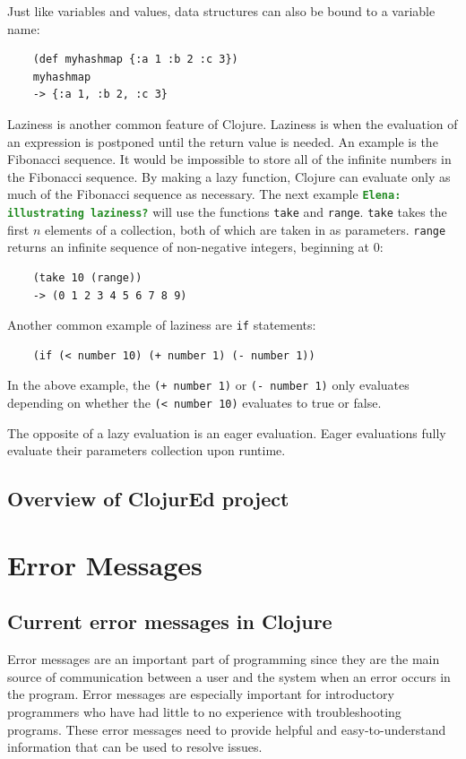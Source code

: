 \documentclass[12pt]{article}
\newcommand{\comment}[1]{{\bf \tt  {#1}}}
\newcommand{\emcomment}[1]{\textcolor{ForestGreen}{\comment{Elena: {#1}}}}
\begin{document}
Just like variables and values, data structures can also be bound to a
variable name: 
\begin{verbatim}
	(def myhashmap {:a 1 :b 2 :c 3})
	myhashmap
	-> {:a 1, :b 2, :c 3}
\end{verbatim}

Laziness is another common feature of Clojure. Laziness is when the evaluation of an expression is
postponed until the return value is needed. An example is the Fibonacci sequence. It would be
impossible to store all of the infinite numbers in the Fibonacci sequence. By making a lazy function,
Clojure can
evaluate only as much of the Fibonacci sequence as necessary. The next example \emcomment{illustrating laziness?} will use the functions 
\texttt{take} and \texttt{range}. \texttt{take} takes the first $n$ elements of a collection, both of
which are taken in as parameters. \texttt{range} returns an infinite sequence of non-negative
integers, beginning at 0:
\begin{verbatim}
	(take 10 (range))
	-> (0 1 2 3 4 5 6 7 8 9)
\end{verbatim}

Another common example of laziness are \texttt{if} statements:

\begin{verbatim}
	(if (< number 10) (+ number 1) (- number 1))
\end{verbatim}

In the above example, the \texttt{(+ number 1)} or \texttt{(- number 1)} only evaluates depending on
whether the \texttt{(< number 10)} evaluates to true or false.

The opposite of a lazy evaluation is an eager evaluation. Eager evaluations fully evaluate their
parameters collection upon runtime.


\subsection{Overview of ClojurEd project}\label{sec:project}

\section{Error Messages}\label{sec:errors}

\subsection{Current error messages in Clojure}\label{sec:currentem}
Error messages are an important part of programming since they are the main source of communication between a user and the system when an error occurs in the program.
Error messages are especially important for introductory programmers who have had little to no experience with troubleshooting programs. %
These error messages need to provide helpful and easy-to-understand information that can be used to resolve issues.
\end{document}
